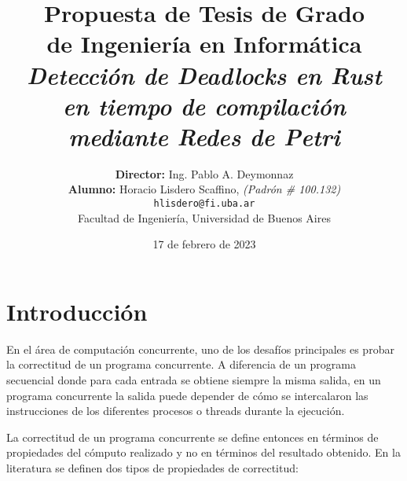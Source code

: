 \documentclass[12pt]{article}
\begin{document}
\begin{titlepage}

    \title{     \textbf{Propuesta de Tesis de Grado \\ de Ingeniería en Informática}\\[2.5ex]
        \textit{Detección de Deadlocks en Rust \\en tiempo de compilación \\mediante Redes de Petri} }

    \author{
        \textbf{Director:} Ing. Pablo A. Deymonnaz\\[2.5ex]
        \textbf{Alumno:} Horacio Lisdero Scaffino, \textit{(Padrón \# 100.132)}                                \\
        \texttt{ hlisdero@fi.uba.ar }                                    \\[2.5ex]
        \normalsize{Facultad de Ingeniería, Universidad de Buenos Aires}        \\
    }

    \date{17 de febrero de 2023}

\end{titlepage}

\maketitle
\thispagestyle{empty}

\maketitle{
    \hypersetup{linkcolor=black}
    \tableofcontents
}

\section{Introducción}

En el área de computación concurrente, uno de los desafíos principales es probar la correctitud de un programa concurrente.
A diferencia de un programa secuencial donde para cada entrada se obtiene siempre la misma salida, en un programa concurrente
la salida puede depender de cómo se intercalaron las instrucciones de los diferentes procesos o threads durante la ejecución.

La correctitud de un programa concurrente se define entonces en términos de propiedades del cómputo realizado y no en términos del
resultado obtenido. En la literatura se definen dos tipos de propiedades de correctitud\cite{ben-ari2006}\cite{coulouris2012}\cite{tanenbaum2017}:
\end{document}
